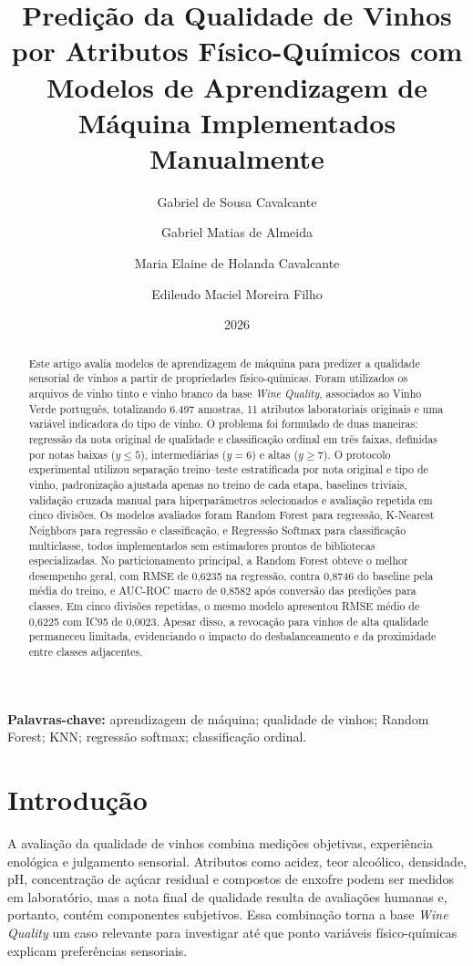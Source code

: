 \documentclass[12pt,a4paper]{article}
\title{Predi\c{c}\~ao da Qualidade de Vinhos por Atributos F\'isico-Qu\'imicos com Modelos de Aprendizagem de M\'aquina Implementados Manualmente}
\author{Gabriel de Sousa Cavalcante \and Gabriel Matias de Almeida \and Maria Elaine de Holanda Cavalcante \and Edileudo Maciel Moreira Filho}
\date{2026}
\begin{document}
\maketitle

\begin{abstract}
Este artigo avalia modelos de aprendizagem de m\'aquina para predizer a qualidade sensorial de vinhos a partir de propriedades f\'isico-qu\'imicas. Foram utilizados os arquivos de vinho tinto e vinho branco da base \textit{Wine Quality}, associados ao Vinho Verde portugu\^es, totalizando 6.497 amostras, 11 atributos laboratoriais originais e uma vari\'avel indicadora do tipo de vinho. O problema foi formulado de duas maneiras: regress\~ao da nota original de qualidade e classifica\c{c}\~ao ordinal em tr\^es faixas, definidas por notas baixas ($y \leq 5$), intermedi\'arias ($y=6$) e altas ($y \geq 7$). O protocolo experimental utilizou separa\c{c}\~ao treino--teste estratificada por nota original e tipo de vinho, padroniza\c{c}\~ao ajustada apenas no treino de cada etapa, baselines triviais, valida\c{c}\~ao cruzada manual para hiperpar\^ametros selecionados e avalia\c{c}\~ao repetida em cinco divis\~oes. Os modelos avaliados foram Random Forest para regress\~ao, K-Nearest Neighbors para regress\~ao e classifica\c{c}\~ao, e Regress\~ao Softmax para classifica\c{c}\~ao multiclasse, todos implementados sem estimadores prontos de bibliotecas especializadas. No particionamento principal, a Random Forest obteve o melhor desempenho geral, com RMSE de 0,6235 na regress\~ao, contra 0,8746 do baseline pela m\'edia do treino, e AUC-ROC macro de 0,8582 ap\'os convers\~ao das predi\c{c}\~oes para classes. Em cinco divis\~oes repetidas, o mesmo modelo apresentou RMSE m\'edio de 0,6225 com IC95 de 0,0023. Apesar disso, a revoca\c{c}\~ao para vinhos de alta qualidade permaneceu limitada, evidenciando o impacto do desbalanceamento e da proximidade entre classes adjacentes.
\end{abstract}

\noindent\textbf{Palavras-chave:} aprendizagem de m\'aquina; qualidade de vinhos; Random Forest; KNN; regress\~ao softmax; classifica\c{c}\~ao ordinal.

\section{Introdu\c{c}\~ao}
\label{sec:introducao}

A avalia\c{c}\~ao da qualidade de vinhos combina medi\c{c}\~oes objetivas, experi\^encia enol\'ogica e julgamento sensorial. Atributos como acidez, teor alco\'olico, densidade, pH, concentra\c{c}\~ao de a\c{c}\'ucar residual e compostos de enxofre podem ser medidos em laborat\'orio, mas a nota final de qualidade resulta de avalia\c{c}\~oes humanas e, portanto, cont\'em componentes subjetivos. Essa combina\c{c}\~ao torna a base \textit{Wine Quality} um caso relevante para investigar at\'e que ponto vari\'aveis f\'isico-qu\'imicas explicam prefer\^encias sensoriais.
\end{document}

